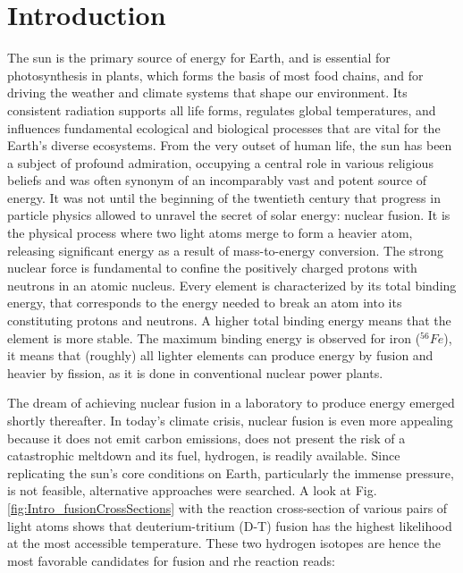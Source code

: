 \chapter{Introduction}
\label{chap:Intro}
The sun is the primary source of energy for Earth, and is essential for photosynthesis in plants, which forms the basis of most food chains, and for driving the weather and climate systems that shape our environment. Its consistent radiation supports all life forms, regulates global temperatures, and influences fundamental ecological and biological processes that are vital for the Earth's diverse ecosystems. From the very outset of human life, the sun has been a subject of profound admiration, occupying a central role in various religious beliefs and was often synonym of an incomparably vast and potent source of energy. It was not until the beginning of the twentieth century that progress in particle physics allowed to unravel the secret of solar energy: nuclear fusion. It is the physical process where two light atoms merge to form a heavier atom, releasing significant energy as a result of mass-to-energy conversion. The strong nuclear force is fundamental to confine the positively charged protons with neutrons in an atomic nucleus. Every element is characterized by its total binding energy, that corresponds to the energy needed to break an atom into its constituting protons and neutrons. A higher total binding energy means that the element is more stable. The maximum binding energy is observed for iron ($^{56}Fe$), it means that (roughly) all lighter elements can produce energy by fusion and heavier by fission, as it is done in conventional nuclear power plants.  \newline 

The dream of achieving nuclear fusion in a laboratory to produce energy emerged shortly thereafter. In today's climate crisis, nuclear fusion is even more appealing because it does not emit carbon emissions, does not present the risk of a catastrophic meltdown and its fuel, hydrogen, is readily available. Since replicating the sun's core conditions on Earth, particularly the immense pressure, is not feasible, alternative approaches were searched. A look at Fig. \ref{fig:Intro_fusionCrossSections} with the reaction cross-section of various pairs of light atoms shows that deuterium-tritium (D-T) fusion has the highest likelihood at the most accessible temperature. These two hydrogen isotopes are hence the most favorable candidates for fusion and rhe reaction reads: \newline


